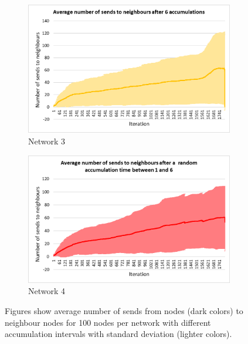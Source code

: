 \documentclass[USenglish]{uit-thesis}
\begin{document}
\begin{figure}
\begin{subfigure}[b]{0.475\textwidth}
            \includegraphics[width=\textwidth]{numSends_stdev_6.png}
            \caption[]%
            {{\small Network 3}}    
            \label{fig:sendfig3}
        \end{subfigure}
        \quad
        \begin{subfigure}[b]{0.475\textwidth}   
            \centering 
            \includegraphics[width=\textwidth]{numSends_stdev_rand.png}
            \caption[]%
            {{\small Network 4}}    
            \label{fig:sendfig4}
        \end{subfigure}
        \caption[Figures show average number of sends from nodes to neighbour nodes for 100 nodes per network with different accumulation intervals with standard deviation.]
        {\small Figures show average number of sends from nodes (dark colors) to neighbour nodes for 100 nodes per network with different accumulation intervals with standard deviation (lighter colors).} 
        \label{fig:sendsChart}
    \end{figure}
\end{document}

